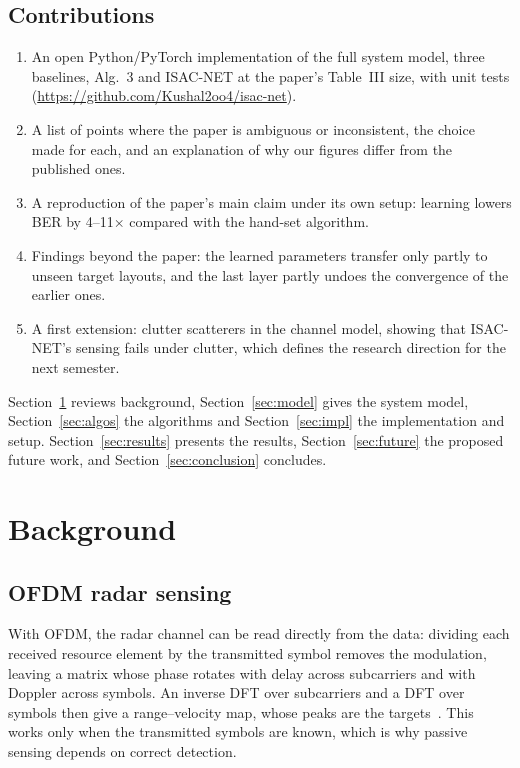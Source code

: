 \documentclass[11pt,a4paper]{article}
\begin{document}
\subsection{Contributions}
\begin{enumerate}
  \item An open Python/PyTorch implementation of the full system model, three baselines, Alg.~3 and ISAC-NET at the paper's Table~III size, with unit tests (\url{https://github.com/Kushal2oo4/isac-net}).
  \item A list of points where the paper is ambiguous or inconsistent, the choice made for each, and an explanation of why our figures differ from the published ones.
  \item A reproduction of the paper's main claim under its own setup: learning lowers BER by 4--11$\times$ compared with the hand-set algorithm.
  \item Findings beyond the paper: the learned parameters transfer only partly to unseen target layouts, and the last layer partly undoes the convergence of the earlier ones.
  \item A first extension: clutter scatterers in the channel model, showing that ISAC-NET's sensing fails under clutter, which defines the research direction for the next semester.
\end{enumerate}

Section~\ref{sec:background} reviews background, Section~\ref{sec:model} gives the system model, Section~\ref{sec:algos} the algorithms and Section~\ref{sec:impl} the implementation and setup. Section~\ref{sec:results} presents the results, Section~\ref{sec:future} the proposed future work, and Section~\ref{sec:conclusion} concludes.

\section{Background}\label{sec:background}
\subsection{OFDM radar sensing}
With OFDM, the radar channel can be read directly from the data: dividing each received resource element by the transmitted symbol removes the modulation, leaving a matrix whose phase rotates with delay across subcarriers and with Doppler across symbols. An inverse DFT over subcarriers and a DFT over symbols then give a range--velocity map, whose peaks are the targets~\cite{sturm2011}. This works only when the transmitted symbols are known, which is why passive sensing depends on correct detection.
\end{document}
